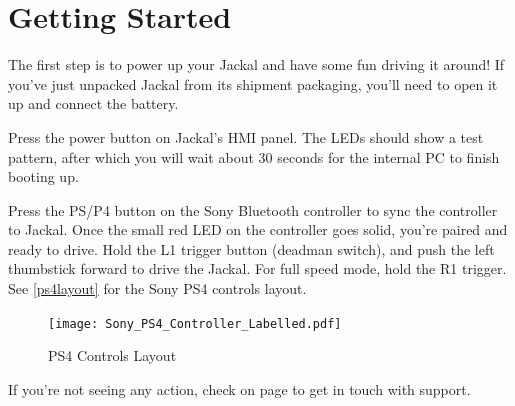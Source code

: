 \documentclass[]{clearpath-latex/clearpath-manual}
\begin{document}

\section{Getting Started}

The first step is to power up your Jackal and have some fun driving it around! If you've
just unpacked Jackal from its shipment packaging, you'll need to open it up and connect the
battery.

Press the power button  on
Jackal's HMI panel. The LEDs should show a test pattern, after which you will wait about 30
seconds for the internal PC to finish booting up.


Press the PS/P4 button on the Sony Bluetooth controller to sync the controller to Jackal. Once
the small red LED on the controller goes solid, you're paired and ready to drive. Hold the L1 trigger
button (deadman switch), and push the left thumbstick forward to drive the Jackal. For full speed mode, hold the R1 trigger.  See \autoref{ps4layout} for the Sony PS4 controls layout.

\begin{figure}[H]
  \centering
  \texttt{[image: Sony\_PS4\_Controller\_Labelled.pdf]}
  \caption{PS4 Controls Layout}
  \label{ps4layout}
\end{figure}


If you're not seeing any action, check  on page \pageref{trouble} to
get in touch with support.
\end{document}
